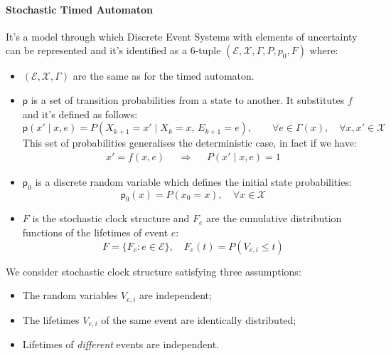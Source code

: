 \documentclass[12pt,a4paper]{article}
\newcommand*{\transp}{\mathsf{p}}
\begin{document}
\paragraph{Stochastic Timed Automaton}
It’s a model through which Discrete Event Systems with elements of uncertainty can be represented and it’s identified as a $6$-tuple $(\mathcal{E},\mathcal{X},\Gamma,P,p_0,F)$ where:
\begin{itemize}
\item $(\mathcal{E},\mathcal{X},\Gamma)$ are the same as for the timed automaton.
\item $\transp$ is a set of transition probabilities from a state to another. It substitutes $f$ and it’s defined as follows:
$$
\transp(x' \mid x,e) = P\left(X_{k+1} = x' \mid X_k = x, \, E_{k+1} = e\right), \qquad \forall e \in \Gamma(x) , \quad \forall x,x' \in \mathcal{X}
$$
This set of probabilities generalises the deterministic case, in fact if we have:
$$
\begin{matrix}
x'=f(x,e)&&\Rightarrow && P(x' \mid x,e)=1
\end{matrix}
$$
\item $\transp_0$ is a discrete random variable which defines the initial state probabilities:
$$
\transp_0(x)=P(x_0 = x), \quad \forall x\in \mathcal{X}
$$
\item $F$ is the stochastic clock structure and $F_e$ are the cumulative distribution functions of the lifetimes of event $e$:
$$
F = \{F_e : e \in \mathcal{E}\}, \quad F_e(t) = P(V_{e,i} \leq t)
$$
\end{itemize}
\noindent
We consider stochastic clock structure satisfying three assumptions:
\begin{itemize}
	\item The random variables $V_{e,i}$ are independent;
	\item The lifetimes $V_{e,i}$ of the same event are identically distributed;
	\item Lifetimes of \textit{different} events are independent.
\end{itemize}
\end{document}
